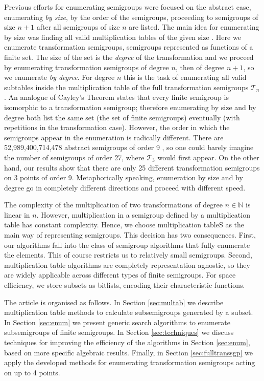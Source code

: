 \documentclass{amsart}
\newcommand{\cT}{{\mathcal T}}
\theoremstyle{plain}
\theoremstyle{definition}
\begin{document}
Previous efforts for enumerating semigroups were focused on the abstract case, enumerating \emph{by size}, by the order of the semigroups, proceeding to semigroups of size $n+1$ after all semigroups of size $n$ are listed.
The main idea for enumerating by size was finding all valid multiplication tables of the given size \cite{monoidenum2009,For55,JW77,KRS76,Ple67,SZT94,tamura2,tamura1}.
Here we enumerate transformation semigroups, semigroups represented as functions of a finite set.
The size of the set is the \emph{degree} of the transformation and we proceed by enumerating transformation semigroups of degree $n$, then of degree $n+1$, so we enumerate \emph{by degree}.
For degree $n$ this is the task of enumerating all valid subtables inside the
multiplication table of the full transformation semigroups $\cT_n$. 
An analogue of Cayley's Theorem states that every finite semigroup is isomorphic to
a transformation semigroup; therefore enumerating by size and by degree both
list the same set (the set of finite semigroups) eventually (with repetitions in the transformation
case).
 However,
the order in which the semigroups appear in the enumeration is radically
different.  There are 52,989,400,714,478 abstract semigroups of order 9
\cite{monoidenum2009}, so one could barely imagine the number of semigroups of
order 27, where $\cT_3$ would first appear.  On the other hand, our results show that there are only
25 different transformation semigroups on 3 points of order 9.
Metaphorically speaking, enumeration by size and by degree go in completely different
directions and proceed with different speed.

The complexity of the multiplication of two transformations of degree $n\in\mathbb{N}$ is linear in $n$.
However, multiplication in a semigroup defined by a multiplication table has constant complexity.
Hence, we choose multiplication tableS as the main way of representing semigroups.
This decision has two consequences. 
First, our algorithms fall into the class of semigroup algorithms that fully enumerate the elements.
This of course  restricts us to relatively small semigroups.%
Second, multiplication table algorithms are completely representation agnostic,
so they are widely applicable across different types of finite semigroups.
For space efficiency, we store subsets as bitlists, encoding their characteristic functions.

The article is organised as follows.
In Section \ref{sec:multab} we describe multiplication table methods to calculate subsemigroups generated by a subset.
In Section \ref{sec:enum} we present generic search algorithms to enumerate subsemigroups of
finite semigroups.
In Section \ref{sec:techniques} we discuss techniques for improving the
efficiency of the algorithms in Section \ref{sec:enum}, based on more specific algebraic results.
Finally, in Section \ref{sec:fulltranssgp} we apply the developed methods for enumerating transformation semigroups acting on up to 4 points.
\end{document}
